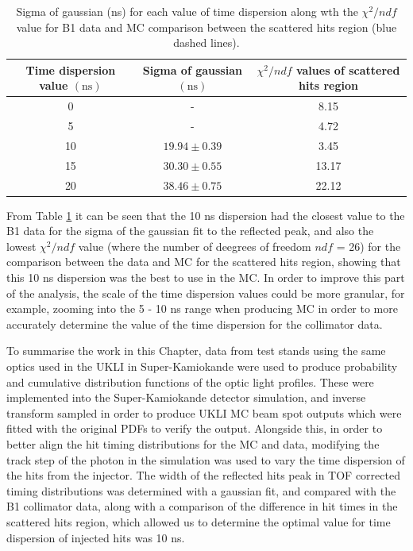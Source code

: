 \begin{table}[htp]
\centering
\begin{tabular}{||c|c|c||}
     \hline Time dispersion value $(\mathrm{ns})$ & Sigma of gaussian $(\mathrm{ns})$ & $\chi^2 / n d f$ values of scattered hits region \\
    \hline 0 & - & 8.15 \\
    \hline 5 & - & 4.72 \\
    \hline 10 & $19.94 \pm 0.39$ & 3.45 \\
    \hline 15 & $30.30 \pm 0.55$ & 13.17 \\
    \hline 20 & $38.46 \pm 0.75$ & 22.12 \\
    \hline 
\end{tabular}   
\caption{Sigma of gaussian (ns) for each value of time dispersion along wth the $\chi^2/ndf$ value for B1 data and MC comparison between the scattered hits region (blue dashed lines).} 
\label{table:reflected_peak_gaussian}
\end{table}

From Table \ref{table:reflected_peak_gaussian} it can be seen that the 10 ns dispersion had the closest value to the B1 data for the sigma of the gaussian fit to the reflected peak, and also the lowest $\chi^2/ndf$ value (where the number of deegrees of freedom $ndf$ = 26) for the comparison between the data and MC for the scattered hits region, showing that this 10 ns dispersion was the best to use in the MC. In order to improve this part of the analysis, the scale of the time dispersion values could be more granular, for example, zooming into the 5 - 10 ns range when producing MC in order to more accurately determine the value of the time dispersion for the collimator data.

To summarise the work in this Chapter, data from test stands using the same optics used in the UKLI in Super-Kamiokande were used to produce probability and cumulative distribution functions of the optic light profiles. These were implemented into the Super-Kamiokande detector simulation, and inverse transform sampled in order to produce UKLI MC beam spot outputs which were fitted with the original PDFs to verify the output. Alongside this, in order to better align the hit timing distributions for the MC and data, modifying the track step of the photon in the simulation was used to vary the time dispersion of the hits from the injector. The width of the reflected hits peak in TOF corrected timing distributions was determined with a gaussian fit, and compared with the B1 collimator data, along with a comparison of the difference in hit times in the scattered hits region, which allowed us to determine the optimal value for time dispersion of injected hits was 10 ns.
